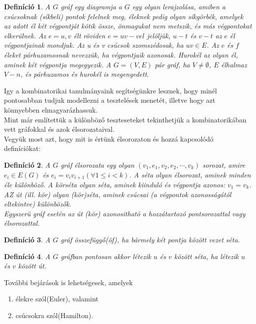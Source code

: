 \documentclass[12pt]{article}
\newtheorem{defin}{Definíció}[section]
\begin{document}
\begin{defin}
A $G$ gráf egy diagramja a $G$ egy olyan lerajzolása, amiben a csúcsoknak (síkbeli) pontok felelnek meg, éleknek pedig olyan síkgörbék, amelyek az adott él két végpontját kötik össze, önmagukat nem metszik, és más végpontokat elkerülnek. Az $e = {u, v}$ élt röviden $e = uv-vel$ jelöljük, $u-t$ és $v-t$ az $e$ él végpontjainak mondjuk. Az u és v csúcsok szomszédosak, ha $uv \in E$. Az $e$ és $f$ éleket párhuzamosnak nevezzük, ha végpontjaik azonosak. Hurokél az olyan él, aminek két végpontja megegyezik. A $G = (V,E)$ pár gráf, ha $V \neq \emptyset$, $E$ élhalmaz $V-n$, és párhuzamos és hurokél is megengedett. ~\cite{szam:Fleiner}
\end{defin}

Igy a kombinatorikai tanulmányaink segítségünkre lesznek, hogy minél pontosabban tudjuk modellezni a tesztelések menetét, illetve hogy azt könnyebben elmagyarázhassuk.\\
Mint már említettük a különböző teszteseteket tekinthetjük a kombinatorikában vett gráfokkal és azok élsorozataival.\\

Vegyük most azt, hogy mit is értünk élsorozaton és hozzá kapcsolódó definíciókat:

\begin{defin}
A $G$ gráf élsorozata egy olyan $(v_1,e_1,v_2,e_2,\cdots,v_k)$ sorozat, amire $e_i \in E(G)$ és $e_i = v_iv_{i+1} (\forall 1 \leq i < k)$. A séta olyan élsorozat, aminek minden éle különböző. A körséta olyan séta, aminek kiinduló és végpontja azonos: $v_1 = v_k$. AZ út (ill. kör) olyan (kör)séta, aminek csúcsai (a végpontok azonosságától eltekintve) különbözők.\\
Egyszerü gráf esetén az út (kör) azonositható a hozzátartozó pontsorozattal vagy élsorozattal. ~\cite{szam:Fleiner}
\end{defin}

\begin{defin}
A $G$ gráf összefüggő(öf), ha bármely két pontja között vezet séta. ~\cite{szam:Fleiner}
\end{defin}

\begin{defin}
A $G$ gráfban pontosan akkor létezik $u$ és $v$ között séta, ha létezik $u$ és $v$ között út. ~\cite{szam:Fleiner}
\end{defin}

További bejárások is lehetségesek, amelyek
\begin{enumerate}
\item élekre szól(Euler), valamint 
\item csúcsokra szól(Hamilton).
\end{enumerate}
\end{document}

